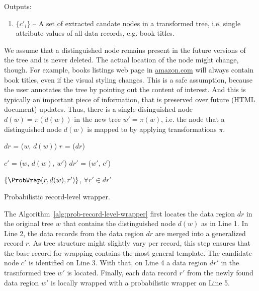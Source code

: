 Outputs: 

\begin{enumerate}
	\item $\{c'_i\}$ -- A set of extracted candate nodes in a transformed tree, i.e. single attribute values of all data records, e.g. book titles.
\end{enumerate}

We assume that a distinguished node remains present in the future versions of the tree and is never deleted. The actual location of the node might change, though. For example, books listings web page in \url{amazon.com} will always contain book titles, even if the visual styling changes. This is a safe assumption, because the user annotates the tree by pointing out the content of interest. And this is typically an important piece of information, that is preserved over future (HTML document) updates. Thus, there is a single disinguished node $d(w) = \pi(d(w))$ in the new tree $w'=\pi(w)$, i.e. the node that a distinguished node $d(w)$ is mapped to by applying transformations $\pi$.

\IncMargin{2em}
\begin{algorithm}[h]

	\DontPrintSemicolon

	\BlankLine

	$dr$ = \LocateDataRegionContainingNode($w$, $d(w)$) \;
	$r$ = \MergeDataRecords($dr$) \;

	$c'$ = \ProbWrap($w$, $d(w)$, $w'$) \;
	$dr'$ = \LocateDataRegionContainingNode($w'$, $c'$) \;

	\Return $\left\{ \ProbWrap(r, d(w), r') \right\}$, $\forall r' \in dr'$ \;

	\caption{Probabilistic record-level wrapper.}
	\label{alg:prob-record-level-wrapper}

\end{algorithm}
\DecMargin{2em}

The Algorithm~\ref{alg:prob-record-level-wrapper} first locates the data region $dr$ in the original tree $w$ that contains the distinguished node $d(w)$ as in Line 1. In Line 2, the data records from the data region $dr$ are merged into a generalized record $r$. As tree structure might slightly vary per record, this step ensures that the base record for wrapping contains the most general template. The candidate node $c'$ is identified on Line 3. With that, on Line 4 a data region $dr'$ in the trasnformed tree $w'$ is located. Finally, each data record $r'$ from the newly found data region $w'$ is locally wrapped with a probabilistic wrapper on Line 5.

